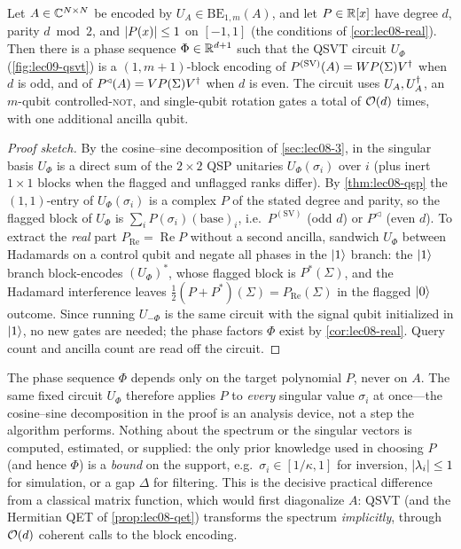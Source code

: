 \begin{theorem}
\label{thm:lec09-qsvt}
Let $A\in\mathbb{C}^{N\times N}$ be encoded by $U_A\in\mathrm{BE}_{1,m}(A)$, and let
$P\in\mathbb{R}[x]$ have degree $d$, parity $d\bmod2$, and $\left\lvert P(x) \right\rvert\le1$ on $[-1,1]$ (the
conditions of \cref{cor:lec08-real}). Then there is a phase sequence
$\Phi\in\mathbb{R}^{d+1}$ such that the QSVT circuit $U_\Phi$ (\cref{fig:lec09-qsvt}) is a
$(1,m+1)$-block encoding of $P^{(\mathrm{SV})}(A)=W P(\Sigma) V^{\dagger}$ when $d$ is odd,
and of $P^{\triangleleft}(A)=V P(\Sigma) V^{\dagger}$ when $d$ is even. The circuit uses
$U_A,U_A^{\dagger}$, an $m$-qubit controlled-\textsc{not}, and single-qubit rotation gates a
total of $\mathcal{O}(d)$ times, with one additional ancilla qubit.
\end{theorem}

\begin{proof}[Proof sketch]
By the cosine--sine decomposition of \cref{sec:lec08-3}, in the singular basis $U_\Phi$
is a direct sum of the $2\times2$ QSP unitaries $U_\Phi(\sigma_i)$ over $i$ (plus inert
$1\times1$ blocks when the flagged and unflagged ranks differ). By
\cref{thm:lec08-qsp} the $(1,1)$-entry of $U_\Phi(\sigma_i)$ is a complex $P$ of the
stated degree and parity, so the flagged block of $U_\Phi$ is $\sum_i P(\sigma_i)
(\text{base})_i$, i.e.\ $P^{(\mathrm{SV})}$ (odd $d$) or $P^{\triangleleft}$ (even $d$).
To extract the \emph{real} part $P_{\mathrm{Re}}=\operatorname{Re}P$ without a second
ancilla, sandwich $U_\Phi$ between Hadamards on a control qubit and negate all phases in
the $\ket1$ branch: the $\ket1$ branch block-encodes $(U_\Phi)^*$, whose flagged block
is $P^*(\Sigma)$, and the Hadamard interference leaves $\tfrac12(P+P^*)(\Sigma)=
P_{\mathrm{Re}}(\Sigma)$ in the flagged $\ket0$ outcome. Since running $U_{-\Phi}$ is
the same circuit with the signal qubit initialized in $\ket1$, no new gates are needed;
the phase factors $\Phi$ exist by \cref{cor:lec08-real}. Query count and ancilla count
are read off the circuit.
\end{proof}

\begin{remark}
\label{rem:lec09-nodecomp}
The phase sequence $\Phi$ depends only on the target polynomial $P$, never on $A$. The
same fixed circuit $U_\Phi$ therefore applies $P$ to \emph{every} singular value
$\sigma_i$ at once---the cosine--sine decomposition in the proof is an analysis device,
not a step the algorithm performs. Nothing about the spectrum or the singular vectors is
computed, estimated, or supplied: the only prior knowledge used in choosing $P$ (and hence
$\Phi$) is a \emph{bound} on the support, e.g.\ $\sigma_i\in[1/\kappa,1]$ for inversion,
$\left\lvert \lambda_i \right\rvert\le1$ for simulation, or a gap $\Delta$ for filtering. This is the
decisive practical difference from a classical matrix function, which would first
diagonalize $A$: QSVT (and the Hermitian QET of \cref{prop:lec08-qet}) transforms the
spectrum \emph{implicitly}, through $\mathcal{O}(d)$ coherent calls to the block encoding.
\end{remark}

